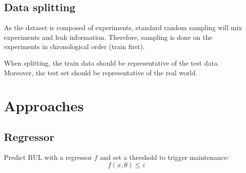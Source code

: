 \subsection{Data splitting}

As the dataset is composed of experiments, standard random sampling will mix experiments and leak information. Therefore, sampling is done on the experiments in chronological order (train first).

\begin{remark}
    When splitting, the train data should be representative of the test data. Moreover, the test set should be representative of the real world.
\end{remark}


\section{Approaches}


\subsection{Regressor} \label{sec:rul_regressor}

Predict RUL with a regressor $f$ and set a threshold to trigger maintenance:
\[ f(x, \theta) \leq \varepsilon \]


